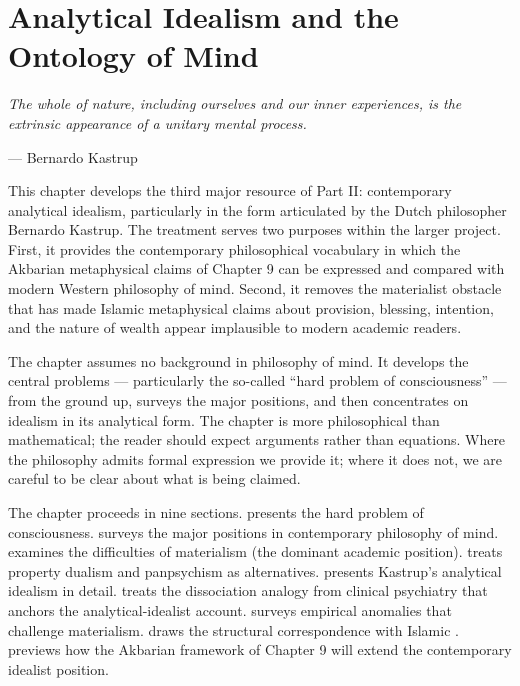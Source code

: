 \chapter{Analytical Idealism and the Ontology of Mind}
\label{ch:analytical-idealism}

\epigraph{\itshape The whole of nature, including ourselves and our
inner experiences, is the extrinsic appearance of a unitary mental
process.}{--- Bernardo Kastrup}

\noindent
This chapter develops the third major resource of Part II:
contemporary analytical idealism, particularly in the form
articulated by the Dutch philosopher Bernardo Kastrup. The treatment
serves two purposes within the larger project. First, it provides
the contemporary philosophical vocabulary in which the Akbarian
metaphysical claims of Chapter 9 can be expressed and compared with
modern Western philosophy of mind. Second, it removes the
materialist obstacle that has made Islamic metaphysical claims about
provision, blessing, intention, and the nature of wealth appear
implausible to modern academic readers.

The chapter assumes no background in philosophy of mind. It develops
the central problems --- particularly the so-called ``hard problem
of consciousness'' --- from the ground up, surveys the major
positions, and then concentrates on idealism in its analytical form.
The chapter is more philosophical than mathematical; the reader
should expect arguments rather than equations. Where the philosophy
admits formal expression we provide it; where it does not, we are
careful to be clear about what is being claimed.

The chapter proceeds in nine sections.
 presents the hard problem of consciousness.
 surveys the major positions in
contemporary philosophy of mind.
 examines the difficulties of
materialism (the dominant academic position).
 treats property dualism and
panpsychism as alternatives.
 presents Kastrup's analytical
idealism in detail.
 treats the dissociation analogy from clinical
psychiatry that anchors the analytical-idealist account.
 surveys empirical anomalies that
challenge materialism.
 draws the structural correspondence
with Islamic .
 previews how the Akbarian framework of
Chapter 9 will extend the contemporary idealist position.

